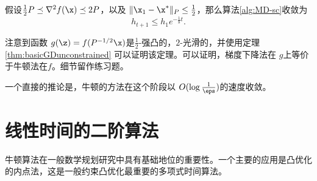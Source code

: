 \begin{algorithm}[h!]
\caption{\textbf{
    预条件的梯度下降
    }}
\label{alg:MD-sc}
\begin{algorithmic}
\ENDFOR
{}
\end{algorithmic}
\end{algorithm}


\begin{lemma} \label{thm:MD-sc}
假设$ \frac{1}{2} P \preceq \nabla^2 f(\x) \preceq 2 P$，以及 $\| \x_1 - \x^*\|_P \leq \frac{1}{2}$，那么算法\ref{alg:MD-sc}收敛为
$$ h_{t+1} \leq  h_1  e^{- \frac{1}{8}  t} .$$
\end{lemma}

注意到函数 $g(\z) = f(P^{-1/2} \x)$是$\frac{1}{2}$-强凸的，$2$-光滑的，并使用定理\ref{thm:basicGDunconstrained} 可以证明该定理。可以证明，梯度下降法在 $g$上等价于牛顿法在$f$。细节留作练习题。

一个直接的推论是，牛顿的方法在这个阶段以 $O(\log \frac{1}{\eps})$的速度收敛。





\section{
    线性时间的二阶算法
    }


牛顿算法在一般数学规划研究中具有基础地位的重要性。一个主要的应用是凸优化的内点法，这是一般约束凸优化最重要的多项式时间算法。

